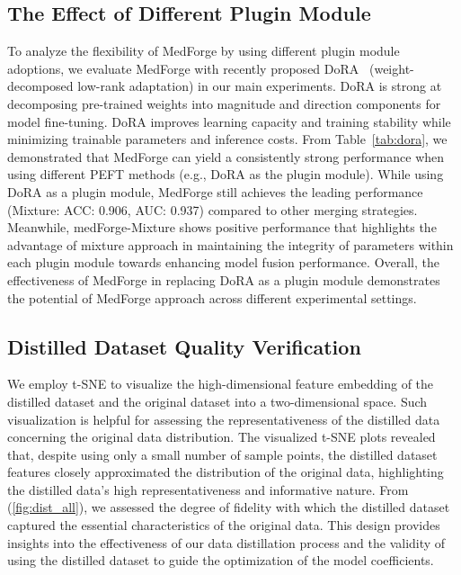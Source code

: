 \subsection{The Effect of Different Plugin Module}
To analyze the flexibility of MedForge by using different plugin module adoptions, we evaluate MedForge with recently proposed DoRA~\cite{liu2024dora} (weight-decomposed low-rank adaptation) in our main experiments. DoRA is strong at decomposing pre-trained weights into magnitude and direction components for model fine-tuning. DoRA improves learning capacity and training stability while minimizing trainable parameters and inference costs. 
From Table~\ref{tab:dora}, we demonstrated that MedForge can yield a consistently strong performance when using different PEFT methods (e.g., DoRA as the plugin module). While using DoRA as a plugin module, MedForge still achieves the leading performance (Mixture: ACC: 0.906, AUC: 0.937) compared to other merging strategies. Meanwhile, medForge-Mixture shows positive performance that highlights the advantage of mixture approach in maintaining the integrity of parameters within each plugin module towards enhancing model fusion performance. Overall, the effectiveness of MedForge in replacing DoRA as a plugin module demonstrates the potential of MedForge approach across different experimental settings.


\subsection{Distilled Dataset Quality Verification} We employ t-SNE to visualize the high-dimensional feature embedding of the distilled dataset and the original dataset into a two-dimensional space. Such visualization is helpful for assessing the representativeness of the distilled data concerning the original data distribution. The visualized t-SNE plots revealed that, despite using only a small number of sample points, the distilled dataset features closely approximated the distribution of the original data, highlighting the distilled data's high representativeness and informative nature. From (\ref{fig:dist_all}), we assessed the degree of fidelity with which the distilled dataset captured the essential characteristics of the original data. This design provides insights into the effectiveness of our data distillation process and the validity of using the distilled dataset to guide the optimization of the model coefficients.






